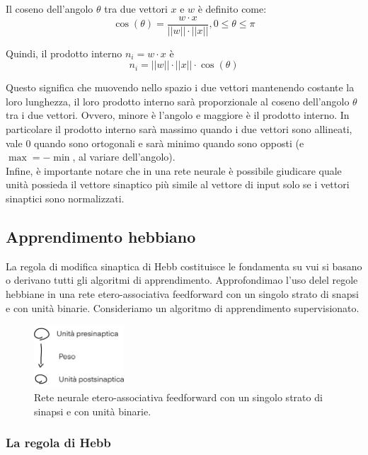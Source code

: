Il coseno dell'angolo $\theta$ tra due vettori $x$ e $w$ è definito come:
\begin{equation*}
	\cos(\theta) = \frac{w \cdot x}{||w|| \cdot ||x||}, 0 \leq \theta \leq \pi
\end{equation*}

Quindi, il prodotto interno $n_i = w \cdot x$ è
\begin{equation*}
	n_i = ||w|| \cdot ||x|| \cdot \cos(\theta)
\end{equation*}

Questo significa che muovendo nello spazio i due vettori mantenendo costante la
loro lunghezza, il loro prodotto interno sarà proporzionale al coseno
dell'angolo $\theta$ tra i due vettori. Ovvero, minore è l'angolo e maggiore è
il prodotto interno. In particolare il prodotto interno sarà massimo quando i
due vettori sono allineati, vale 0 quando sono ortogonali e sarà minimo quando
sono opposti (e $\max = -\min$, al variare dell'angolo).\\
Infine, è importante notare che in una rete neurale è possibile giudicare quale
unità possieda il vettore sinaptico più simile al vettore di input solo se i
vettori sinaptici sono normalizzati.

\subsection{Apprendimento hebbiano}

La regola di modifica sinaptica di Hebb costituisce le fondamenta su vui si
basano o derivano tutti gli algoritmi di apprendimento. Approfondimao l'uso
delel regole hebbiane in una rete etero-associativa feedforward con un singolo
strato di snapsi e con unità binarie. Consideriamo un algoritmo di apprendimento
supervisionato.

\begin{figure}[H]
	\centering
	\includegraphics[width=0.3\textwidth]{assets/Hebb}
	\caption{Rete neurale etero-associativa feedforward con un singolo strato di
		sinapsi e con unità binarie.}
\end{figure}

\subsubsection{La regola di Hebb}


